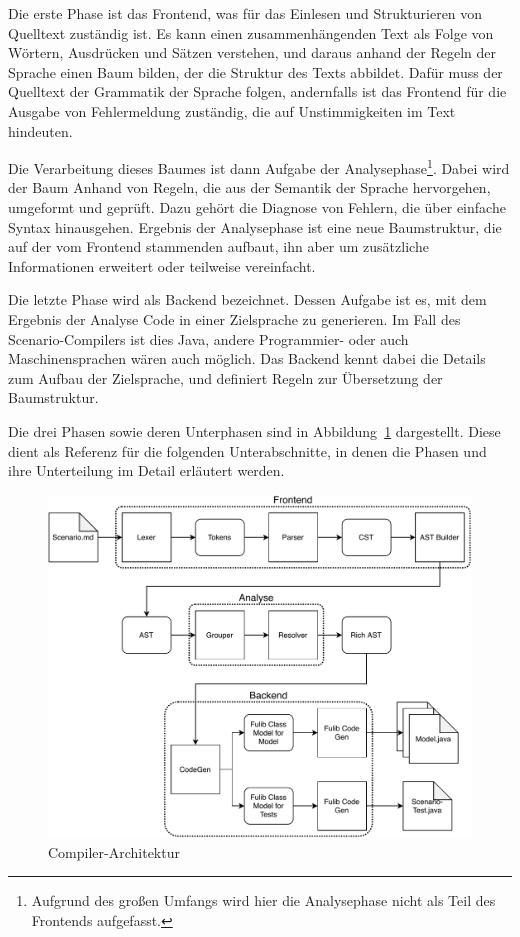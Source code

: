 Die erste Phase ist das Frontend, was für das Einlesen und Strukturieren von Quelltext zuständig ist.
Es kann einen zusammenhängenden Text als Folge von Wörtern, Ausdrücken und Sätzen verstehen,
und daraus anhand der Regeln der Sprache einen Baum bilden,
der die Struktur des Texts abbildet.
Dafür muss der Quelltext der Grammatik der Sprache folgen,
andernfalls ist das Frontend für die Ausgabe von Fehlermeldung zuständig,
die auf Unstimmigkeiten im Text hindeuten.

Die Verarbeitung dieses Baumes ist dann Aufgabe der Analysephase\footnote{Aufgrund des großen Umfangs wird hier die Analysephase nicht als Teil des Frontends aufgefasst.}.
Dabei wird der Baum Anhand von Regeln, die aus der Semantik der Sprache hervorgehen, umgeformt und geprüft.
Dazu gehört die Diagnose von Fehlern, die über einfache Syntax hinausgehen.
Ergebnis der Analysephase ist eine neue Baumstruktur,
die auf der vom Frontend stammenden aufbaut, ihn aber um zusätzliche Informationen erweitert oder teilweise vereinfacht.

Die letzte Phase wird als Backend bezeichnet.
Dessen Aufgabe ist es, mit dem Ergebnis der Analyse Code in einer Zielsprache zu generieren.
Im Fall des Scenario-Compilers ist dies Java, andere Programmier- oder auch Maschinensprachen wären auch möglich.
Das Backend kennt dabei die Details zum Aufbau der Zielsprache,
und definiert Regeln zur Übersetzung der Baumstruktur.

Die drei Phasen sowie deren Unterphasen sind in Abbildung~\ref{fig:compiler-architecture} dargestellt.
Diese dient als Referenz für die folgenden Unterabschnitte,
in denen die Phasen und ihre Unterteilung im Detail erläutert werden.

\begin{figure}
    \includegraphics[width=\textwidth]{chapter/fulib-scenarios/img/architecture.pdf}
    \caption{Compiler-Architektur}
    \label{fig:compiler-architecture}
\end{figure}

